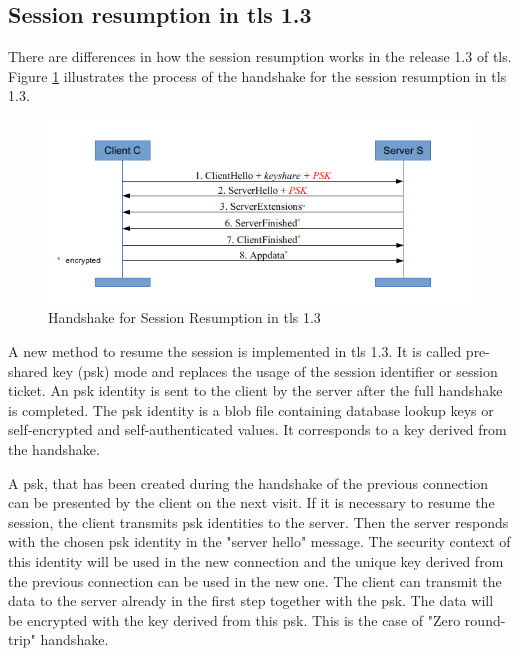\subsection{Session resumption in \gls{tls} 1.3}
\label{subsec:resumption1_3}

There are differences in how the session resumption works in the release 1.3 of \gls{tls}. Figure \ref{fig:resumption1_3} illustrates the process of the handshake for the session resumption in \gls{tls} 1.3.

\begin{figure}[H]
	\centering
		\includegraphics[scale=0.8]{images/resumption1_3.png}
	\caption{Handshake for Session Resumption in \gls{tls} 1.3 \cite{Hassenstein}}
	\label{fig:resumption1_3}
\end{figure}

A new method to resume the session is implemented in \gls{tls} 1.3. It is called pre-shared key (\gls{psk}) mode and replaces the usage of the session identifier or session ticket. An \gls{psk} identity is sent to the client by the server after the full handshake is completed. The \gls{psk} identity is a blob file containing database lookup keys or self-encrypted and self-authenticated values. It corresponds to a key derived from the handshake.

A \gls{psk}, that has been created during the handshake of the previous connection can be presented by the client on the next visit. If it is necessary to resume the session, the client transmits \gls{psk} identities to the server. Then the server responds with the chosen \gls{psk} identity in the "server hello" message. The security context of this identity will be used in the new connection and the unique key derived from the previous connection can be used in the new one. 
The client can transmit the data to the server already in the first step together with the \gls{psk}. The data will be encrypted with the key derived from this \gls{psk}. This is the case of "Zero round-trip" handshake. \cite{ldapwiki:resumption}

